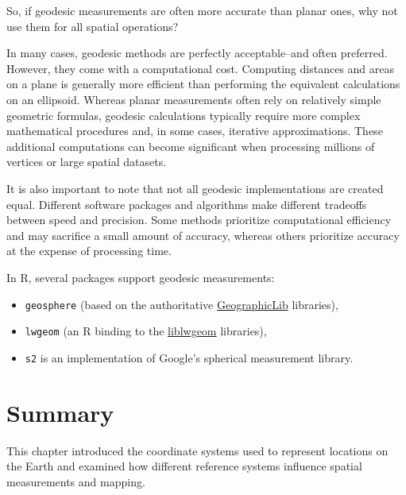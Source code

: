 \documentclass[
  letterpaper,
]{book}
\providecommand{\tightlist}{%
  \setlength{\itemsep}{0pt}\setlength{\parskip}{0pt}}
\begin{document}
So, if geodesic measurements are often more accurate than planar ones,
why not use them for all spatial operations?

In many cases, geodesic methods are perfectly acceptable--and often
preferred. However, they come with a computational cost. Computing
distances and areas on a plane is generally more efficient than
performing the equivalent calculations on an ellipsoid. Whereas planar
measurements often rely on relatively simple geometric formulas,
geodesic calculations typically require more complex mathematical
procedures and, in some cases, iterative approximations. These
additional computations can become significant when processing millions
of vertices or large spatial datasets.

It is also important to note that not all geodesic implementations are
created equal. Different software packages and algorithms make different
tradeoffs between speed and precision. Some methods prioritize
computational efficiency and may sacrifice a small amount of accuracy,
whereas others prioritize accuracy at the expense of processing time.

In R, several packages support geodesic measurements:

\begin{itemize}
\tightlist
\item
  \texttt{geosphere} (based on the authoritative
  \href{https://geographiclib.sourceforge.io/}{GeographicLib}
  libraries),
\item
  \texttt{lwgeom} (an R binding to the
  \href{https://github.com/postgis/postgis/tree/master/liblwgeom}{liblwgeom}
  libraries),
\item
  \texttt{s2} is an implementation of Google's spherical measurement
  library.
\end{itemize}

\section{Summary}\label{summary-7}

This chapter introduced the coordinate systems used to represent
locations on the Earth and examined how different reference systems
influence spatial measurements and mapping.
\end{document}
